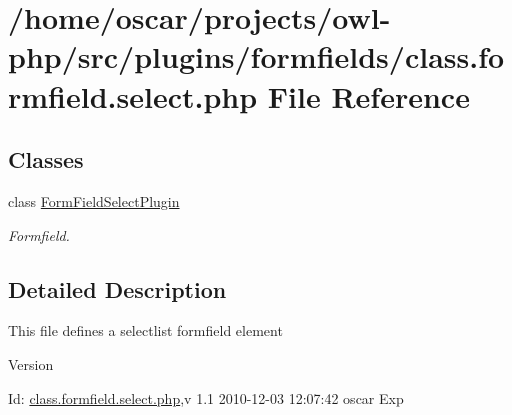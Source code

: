 \section{/home/oscar/projects/owl-\/php/src/plugins/formfields/class.formfield.select.php File Reference}
\label{class_8formfield_8select_8php}
\subsection*{Classes}
\begin{DoxyCompactItemize}
\item 
class \hyperlink{classFormFieldSelectPlugin}{FormFieldSelectPlugin}
\begin{DoxyCompactList}\small\item\em Formfield. \item\end{DoxyCompactList}\end{DoxyCompactItemize}


\subsection{Detailed Description}
This file defines a selectlist formfield element \begin{DoxyVersion}{Version}

\end{DoxyVersion}
\begin{DoxyParagraph}{Id:}
\hyperlink{class_8formfield_8select_8php}{class.formfield.select.php},v 1.1 2010-\/12-\/03 12:07:42 oscar Exp 
\end{DoxyParagraph}
